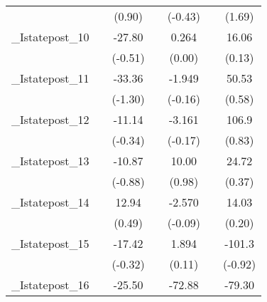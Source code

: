 {\begin{tabular}{l*{6}{c}}
            &                     &      (0.90)         &                     &     (-0.43)         &                     &      (1.69)         \\
[1em]
\_Istatepost\_10&                     &      -27.80         &                     &       0.264         &                     &       16.06         \\
            &                     &     (-0.51)         &                     &      (0.00)         &                     &      (0.13)         \\
[1em]
\_Istatepost\_11&                     &      -33.36         &                     &      -1.949         &                     &       50.53         \\
            &                     &     (-1.30)         &                     &     (-0.16)         &                     &      (0.58)         \\
[1em]
\_Istatepost\_12&                     &      -11.14         &                     &      -3.161         &                     &       106.9         \\
            &                     &     (-0.34)         &                     &     (-0.17)         &                     &      (0.83)         \\
[1em]
\_Istatepost\_13&                     &      -10.87         &                     &       10.00         &                     &       24.72         \\
            &                     &     (-0.88)         &                     &      (0.98)         &                     &      (0.37)         \\
[1em]
\_Istatepost\_14&                     &       12.94         &                     &      -2.570         &                     &       14.03         \\
            &                     &      (0.49)         &                     &     (-0.09)         &                     &      (0.20)         \\
[1em]
\_Istatepost\_15&                     &      -17.42         &                     &       1.894         &                     &      -101.3         \\
            &                     &     (-0.32)         &                     &      (0.11)         &                     &     (-0.92)         \\
[1em]
\_Istatepost\_16&                     &      -25.50         &                     &      -72.88         &                     &      -79.30         \\

\end{tabular}}
